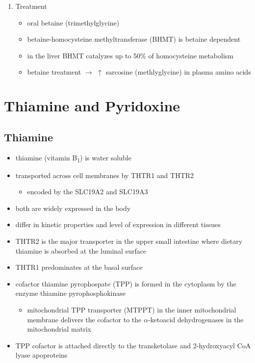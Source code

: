 \documentclass[12pt]{scrartcl}
\begin{document}
\begin{enumerate}
\item Treatment
\label{sec:org00988f9}
\begin{itemize}
\item oral betaine (trimethylglycine)
\item betaine-homocysteine methyltransferase (BHMT) is betaine dependent
\end{itemize}
\begin{itemize}
\item in the liver BHMT catalyzes up to 50\% of homocysteine metabolism
\item betaine treatment \(\to\) \(\uparrow\) sarcosine (methlyglycine) in plasma amino acids
\end{itemize}
\end{enumerate}

\section{Thiamine and Pyridoxine}
\label{sec:org8db5854}
\subsection{Thiamine}
\label{sec:org389e513}
\begin{itemize}
\item thiamine (vitamin B\textsubscript{1}) is water soluble
\item transported across cell membranes by THTR1 and THTR2
\begin{itemize}
\item encoded by the SLC19A2 and SLC19A3
\end{itemize}
\item both are widely expressed in the body
\item differ in kinetic properties and level of expression in different tissues
\item THTR2 is the major transporter in the upper small intestine where
dietary thiamine is absorbed at the luminal surface
\item THTR1 predominates at the basal surface
\item cofactor thiamine pyrophospate (TPP) is formed in the cytoplasm by
the enzyme thiamine pyrophosphokinase
\begin{itemize}
\item mitochondrial TPP transporter (MTPPT) in the inner mitochondrial membrane
delivers the cofactor to the \(\alpha\)-ketoacid dehydrogenases in the
mitochondrial matrix
\end{itemize}
\item TPP cofactor is attached directly to the transketolase and 2-hydroxyacyl CoA lyase apoproteins
\end{itemize}
\end{document}
